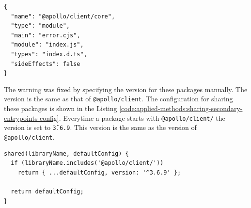 \ifshowListings
\begin{listing}[H]
  \begin{verbatim}
{
  "name": "@apollo/client/core",
  "type": "module",
  "main": "error.cjs",
  "module": "index.js",
  "types": "index.d.ts",
  "sideEffects": false
}
  \end{verbatim}
  \caption{The content of \texttt{package.json} from \texttt{@apollo/client/core}.}\label{code:applied-methods:package-json-apollo-client-core}
\end{listing}
\fi

\noindent The warning was fixed by specifying the version for these packages manually. The version is the same as that of \texttt{@apollo/client}. The configuration for sharing these packages is shown in the Listing \ref{code:applied-methods:sharing-secondary-entrypoints-config}. Everytime a package starts with \texttt{@apollo/client/} the version is set to \texttt{\^3.6.9}. This version is the same as the version of \texttt{@apollo/client}.

\ifshowListings
\begin{listing}[H]
  \begin{verbatim}
shared(libraryName, defaultConfig) {
  if (libraryName.includes('@apollo/client/'))
    return { ...defaultConfig, version: '^3.6.9' };

  return defaultConfig;
}
  \end{verbatim}
  \caption{Specify the version for the secondary entry points for the \texttt{@apollo/client} package.}\label{code:applied-methods:sharing-secondary-entrypoints-config}
\end{listing}
\fi
